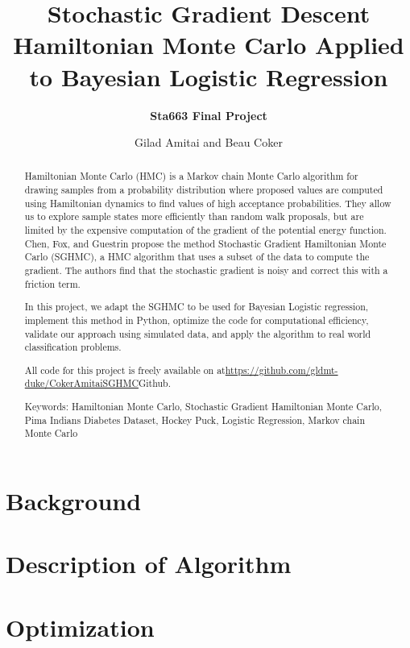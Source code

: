 \documentclass[12pt]{article}
\begin{document}
\vspace{-1in}
\author{\bf Sta663 Final Project}
\title{\bf Stochastic Gradient Descent Hamiltonian Monte Carlo Applied to Bayesian Logistic Regression}
\date{Gilad Amitai and Beau Coker}
\maketitle 


\begin{abstract}
	Hamiltonian Monte Carlo (HMC) is a Markov chain Monte Carlo algorithm for drawing samples from a probability distribution where proposed values are computed using Hamiltonian dynamics to find values of high acceptance probabilities. They allow us to explore sample states more efficiently than random walk proposals, but are limited by the expensive computation of the gradient of the potential energy function. Chen, Fox, and Guestrin propose the method Stochastic Gradient Hamiltonian Monte Carlo (SGHMC), a HMC algorithm that uses a subset of the data to compute the gradient. The authors find that the stochastic gradient is noisy and correct this with a friction term.

	In this project, we adapt the SGHMC to be used for Bayesian Logistic regression, implement this method in Python, optimize the code for computational efficiency, validate our approach using simulated data, and apply the algorithm to real world classification problems.
	
	All code for this project is freely available on  at\url{https://github.com/gldmt-duke/CokerAmitaiSGHMC}{Github}.
	
	Keywords: Hamiltonian Monte Carlo, Stochastic Gradient Hamiltonian Monte Carlo, Pima Indians Diabetes Dataset, Hockey Puck, Logistic Regression, Markov chain Monte Carlo
\end{abstract}

\section{Background}


\section{Description of Algorithm}


\section{Optimization}

\end{document}
